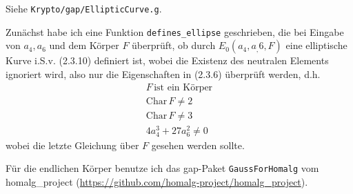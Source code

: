 Siehe \texttt{Krypto/gap/EllipticCurve.g}.

Zunächst habe ich eine Funktion \texttt{defines\_ellipse} geschrieben, die bei Eingabe von $a_{4}, a_{6}$ und dem Körper $F$ überprüft,
ob durch $E_{0}(a_{4}, a_,{6}, F)$ eine elliptische Kurve i.S.v. (2.3.10) definiert ist, wobei die Existenz des neutralen Elements ignoriert wird,
also nur die Eigenschaften in (2.3.6) überprüft werden, d.h.
\begin{align}
F \,\text{ist ein Körper}\\
\mathrm{Char}\,F \neq 2 \\
\mathrm{Char}\,F \neq 3 \\
4a_{4}^{3} + 27a_{6}^{2} \neq\label{istEllipse} 0 
\end{align}
wobei die letzte Gleichung über $F$ gesehen werden sollte.

Für die endlichen Körper benutze ich das gap-Paket \texttt{GaussForHomalg} vom homalg\_project (\url{https://github.com/homalg-project/homalg\_project}).

